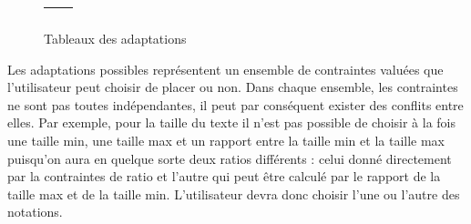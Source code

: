 \documentclass[french,a4paper]{report}
\begin{document}
{\begin{figure}[H]
\begin{center}
\begin{tabular}{| l | c |}
\begin{minipage}{8cm}
\begin{itemize}
\medskip\end{itemize}\end{minipage}\\
\hline
\end{tabular}
\end{center}
\caption{Tableaux des adaptations}
\end{figure}
Les adaptations possibles représentent un ensemble de contraintes
valuées que l'utilisateur peut choisir de placer ou non. Dans chaque
ensemble, les contraintes ne sont pas toutes indépendantes, il peut
par conséquent exister des conflits entre elles. Par exemple, pour la
taille du texte il n'est pas possible de choisir à la fois une taille
min, une taille max et un rapport entre la taille min et la taille max
puisqu'on aura en quelque sorte deux ratios différents : celui donné
directement par la contraintes de ratio et l'autre qui peut être
calculé par le rapport de la taille max et de la taille
min. L'utilisateur devra donc choisir l'une ou l'autre des notations.
}
\end{document}
